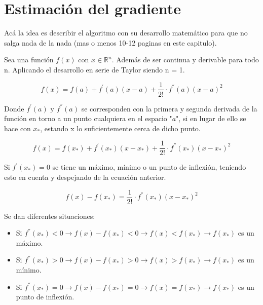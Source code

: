\newpage
\thispagestyle{empty}
\mbox{}

\chapter{Estimación del gradiente}
\label{ch:chapter3}

Acá la idea es describir el algoritmo con su desarrollo matemático para que no salga nada de la nada (mas o menos 10-12 paginas en este capitulo).

Sea una función $f\left(x\right)$ con $x\in\mathbb{R}^{n}$. Además de ser continua y derivable para todo n. Aplicando el desarrollo en serie de Taylor siendo n = 1.

\begin{equation*}
	f\left(x\right)=f\left(a\right)+f^{'}\left(a\right)\left(x-a\right)+\frac{1}{2!}\cdot{f}^{''}\left(a\right){\left(x-a\right)}^{2}
\end{equation*}

Donde $f^{'}\left(a\right)$ y $f^{''}\left(a\right)$ se corresponden con la primera y segunda derivada de la función en torno a un punto cualquiera en el espacio "$a$", si en lugar de ello se hace con $x_*$, estando x lo suficientemente cerca de dicho punto.

\begin{equation*}
	f\left(x\right)=f\left(x_{*}\right)+f^{'}\left(x_{*}\right)\left(x-x_{*}\right)+\frac{1}{2!}\cdot{f}^{''}\left(x_{*}\right){\left(x-x_{*}\right)}^2 
\end{equation*}

Si $f^{'}\left(x_{*}\right)=0$ se tiene un máximo, mínimo o un punto de inflexión, teniendo esto en cuenta y despejando de la ecuación anterior.

\begin{equation*}
	f\left(x\right)-f\left(x_{*}\right)=\frac{1}{2!}\cdot{f}^{''}\left(x_{*}\right){\left(x-x_{*}\right)}^2 
\end{equation*}

\newpage

Se dan diferentes situaciones:

\begin{itemize}
	\item Si $f^{''}\left(x_{*}\right)<0\rightarrow{f}\left(x\right)-f\left(x_{*}\right)<0\rightarrow{f}\left(x\right)<f\left(x_{*}\right)\rightarrow{f}\left(x_{*}\right)$ es un máximo.
	\item Si $f^{''}\left(x_{*}\right)>0\rightarrow{f}\left(x\right)-f\left(x_{*}\right)>0\rightarrow{f}\left(x\right)>f\left(x_{*}\right)\rightarrow{f}\left(x_{*}\right)$ es un mínimo.
	\item Si $f^{''}\left(x_{*}\right)=0\rightarrow{f}\left(x\right)-f\left(x_{*}\right)=0\rightarrow{f}\left(x\right)=f\left(x_{*}\right)\rightarrow{f}\left(x_{*}\right)$ es un punto de inflexión.
\end{itemize}

